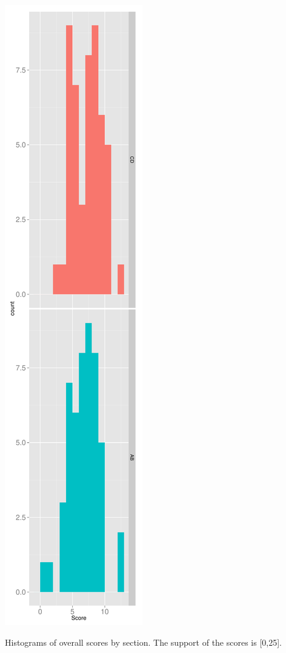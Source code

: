 \documentclass[12pt,nohyper]{tufte-handout}\usepackage[]{graphicx}\usepackage[]{color}
\begin{document}
\begin{marginfigure}\includegraphics[width=0.95\linewidth]{Topic06_overallscore}
\caption{\label{mar:hist}Histograms of overall scores by section. The support of the scores is [0,25].}\end{marginfigure}%
\end{document}
